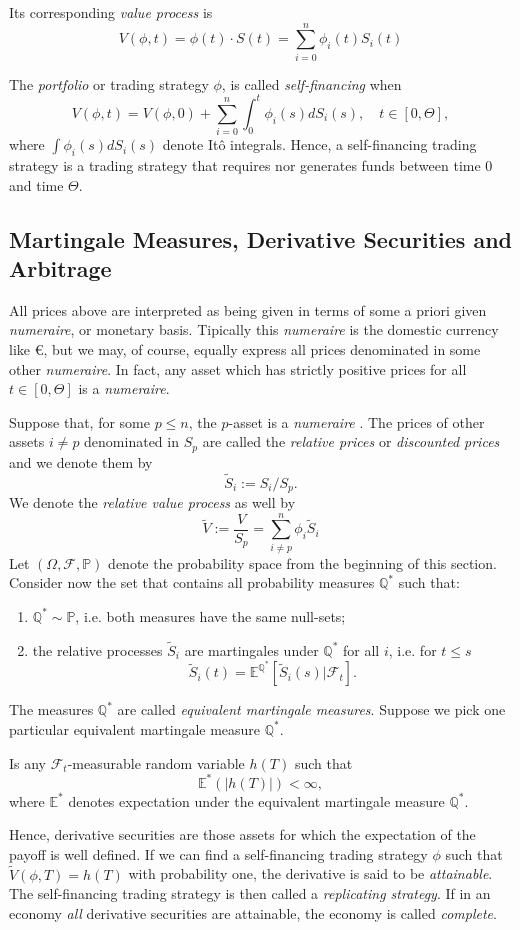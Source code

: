 Its corresponding {\sl value process} is
$$
V(\phi,t)=\phi (t)\cdot S(t)=\sum^n_{i=0} \phi_i(t) S_i(t)
$$

The {\sl portfolio} or trading strategy $\phi$, is called {\sl
  self-financing} when
\begin{equation}
\label{eq:SelfFinancing}
V(\phi,t)=V(\phi,0)+\sum_{i=0}^n\int_0^t \phi_i(s) dS_i(s),\quad
t\in[0, \Theta],
\end{equation}
where $\int \phi_i(s) dS_i(s)$ denote It\^o integrals. Hence, a
self-financing trading strategy is a trading strategy that requires
nor generates funds between time $0$ and time $\Theta$.

\subsection{Martingale Measures, Derivative Securities and Arbitrage}
All prices above are interpreted as being given in terms of some a
priori given {\sl numeraire}, or monetary basis. Tipically this {\sl
  numeraire} is the domestic currency like \euro, but we may, of
course, equally express all prices denominated in some other {\sl
  numeraire}. In fact, any asset which has strictly positive prices
for all $t\in [0, \Theta]$ is a {\sl numeraire}.

Suppose that, for some $p\leq n$, the $p$-asset is a {\sl numeraire}
. The prices of other assets $i\neq p$ denominated in $S_p$ are called
the {\sl relative prices} or {\sl discounted prices} and we denote
them by 
$$
\widetilde{S}_i:=S_i/S_p.
$$
We denote the {\sl relative value process} as well by
$$
\widetilde{V}:=\frac{V}{S_p}=\sum_{i\neq p}^n \phi_i \widetilde{S}_i 
$$
Let $(\Omega, \mathcal{F}, \mathbb{P} )$ denote the probability space
from the beginning of this section. Consider now the set that contains
all probability measures $\mathbb{Q}^*$ such that:
\begin{enumerate}
\item $\mathbb{Q}^* \sim \mathbb{P}$, i.e. both measures have the same
  null-sets; 
\item the relative processes $\widetilde{S}_i$ are martingales under
  $\mathbb{Q}^*$ for all $i$, i.e. for $t\leq s$
$$
\widetilde{S}_i(t)=\mathbb{E}^{\mathbb{Q}^*}[ \widetilde{S}_i(s)|\mathcal{F}_t].
$$
\end{enumerate}
The measures $\mathbb{Q}^*$ are called {\sl equivalent martingale
  measures}. Suppose we pick one particular equivalent martingale
measure
$\mathbb{Q}^*$. 
\begin{defn} Is any $\mathcal{F}_t$-measurable
  random variable $h(T)$ such that
$$
\mathbb{E}^*(|h(T)|) < \infty,
$$
where $\mathbb{E}^*$ denotes expectation under the equivalent martingale
measure $\mathbb{Q}^*$. 
\end{defn}
Hence, derivative securities are those assets for which the
expectation of the payoff is well defined. If we can find a
self-financing trading strategy $\phi$ such that
$\widetilde{V}(\phi,T)=h(T)$ with probability one, the derivative is
said to be {\sl attainable}. The self-financing trading strategy is
then called a {\sl replicating strategy}. If in an economy \emph{all}
derivative securities are attainable, the economy is called {\sl
  complete}.

